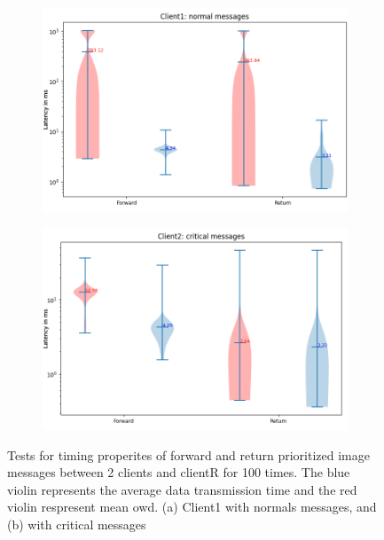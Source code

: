 \begin{figure}[h]
    \centering
    \begin{subfigure}[b]{0.79\textwidth}
    \includegraphics[width=\textwidth]{figures/appendix/priority_tests/log_violin_2clients_image_priority_client1.png}\hfill 
    \caption{} \label{fig: priority-2clients-image-1}
    \end{subfigure}
    \begin{subfigure}[b]{0.79\textwidth}
        \includegraphics[width=\textwidth]{figures/appendix/priority_tests/log_violin_2clients_image_priority_client2.png}\hfill 
        \caption{} \label{fig: priority-2clients-image-2}
    \end{subfigure}
    
    
    \caption{Tests for timing properites of forward and return prioritized image messages between 2 clients 
    and clientR for 100 times. The blue violin represents the average data transmission time and the red violin 
    respresent mean \gls{owd}. (a) Client1 with normals messages, and (b) 
    with critical messages} \label{fig: priority-2clients-image}
\end{figure}



